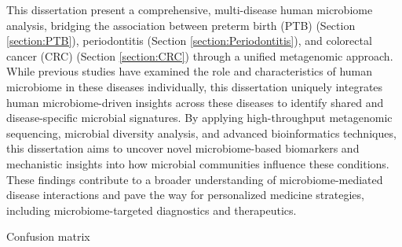 \documentclass[11pt, a4paper, onecolumn, oneside]{report}
\begin{document}
        This dissertation present a comprehensive, multi-disease human microbiome analysis, bridging the association between preterm birth (PTB) (Section \ref{section:PTB}), periodontitis (Section \ref{section:Periodontitis}), and colorectal cancer (CRC) (Section \ref{section:CRC}) through a unified metagenomic approach. While previous studies have examined the role and characteristics of human microbiome in these diseases individually, this dissertation uniquely integrates human microbiome-driven insights across these diseases to identify shared and disease-specific microbial signatures. By applying high-throughput metagenomic sequencing, microbial diversity analysis, and advanced bioinformatics techniques, this dissertation aims to uncover novel microbiome-based biomarkers and mechanistic insights into how microbial communities influence these conditions. These findings contribute to a broader understanding of microbiome-mediated disease interactions and pave the way for personalized medicine strategies, including microbiome-targeted diagnostics and therapeutics.

        \begin{table}[p]
            \centering
            \caption{Confusion matrix}
            \label{tab:confusion}
            
        \end{table}
        \clearpage
\end{document}
